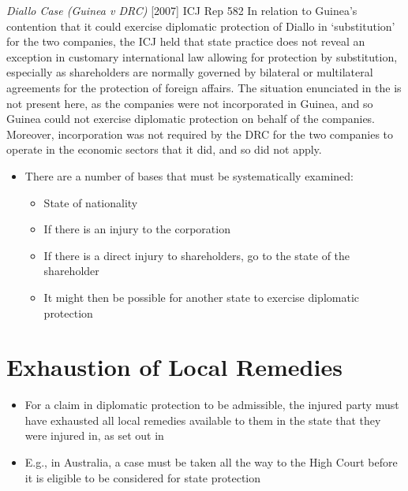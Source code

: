 \begin{casedetails}{\textit{Diallo Case (Guinea v DRC)} [2007] ICJ Rep 582}
    In relation to Guinea's contention that it could exercise diplomatic protection of Diallo in `substitution' for the two companies, the ICJ held that state practice does not reveal an exception in customary international law allowing for protection by substitution, especially as shareholders are normally governed by bilateral or multilateral agreements for the protection of foreign affairs. The situation enunciated in the  is not present here, as the companies were not incorporated in Guinea, and so Guinea could not exercise diplomatic protection on behalf of the companies. Moreover, incorporation was not required by the DRC for the two companies to operate in the economic sectors that it did, and so  did not apply.
\end{casedetails}

\begin{itemize}
    \item There are a number of bases that must be systematically examined:
    \begin{itemize}
        \item State of nationality
        \item If there is an injury to the corporation
        \item If there is a direct injury to shareholders, go to the state of the shareholder
        \item It might then be possible for another state to exercise diplomatic protection
    \end{itemize}
\end{itemize}

\section{Exhaustion of Local Remedies}
\begin{itemize}
    \item For a claim in diplomatic protection to be admissible, the injured party must have exhausted all local remedies available to them in the state that they were injured in, as set out in 
    \item E.g., in Australia, a case must be taken all the way to the High Court before it is eligible to be considered for state protection
\end{itemize}

